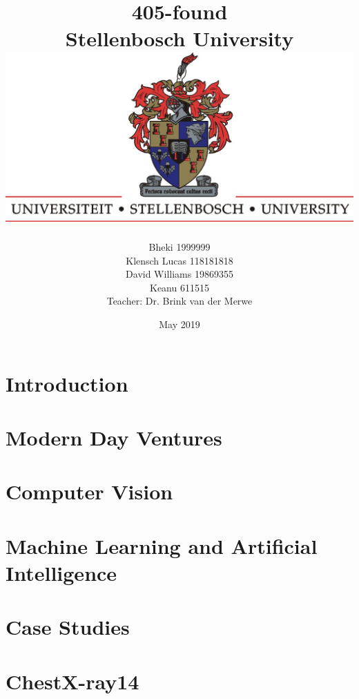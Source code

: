 \documentclass[15pt]{report}
\title{
        {405-found}\\
        {\large Stellenbosch University}\\
        {\includegraphics{symbol.jpg}}
      }
\author{Bheki 1999999 \\ Klensch Lucas 118181818 \\ David Williams 19869355 \\ Keanu 611515\\ Teacher: Dr. Brink van der Merwe\\}
\date{May 2019}
\begin{document}



\tableofcontents

\chapter{Introduction}


\chapter{Modern Day Ventures}


\chapter{Computer Vision}


\chapter{Machine Learning and Artificial Intelligence}


\chapter{Case Studies}


\chapter{ChestX-ray14}

\end{document}
